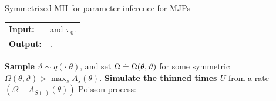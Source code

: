 \begin{algorithm}[H]
   \caption{Symmetrized MH for parameter inference for MJPs }
   \label{alg:MH_improved}
  \begin{tabular}{l l}
   \textbf{Input:  } & \text{The observations $X$,}
                      \text{the MJP path $(s_0, S, T)$, MJP parameters $\theta$} and $\pi_0$.\\ 
   \textbf{Output:  }& \text{A new MJP trajectory $(s'_0, S', T')$, 
                            new MJP parameters $\theta'$}.\\
   \hline
   \end{tabular}
   \begin{algorithmic}[1]
     \State \textbf{Sample $\vartheta \sim q(\cdot| \theta)$}, and 
      set %
	$\Omega \doteq \Omega(\theta,\vartheta)$ %
    for some symmetric $\Omega(\theta,\vartheta) > \max_s A_s(\theta)$.
    \State \textbf{Simulate the thinned times $U$} from a rate-$(\Omega-A_{S(\cdot)}(\theta))$ Poisson process:


\end{algorithmic}
\end{algorithm}
